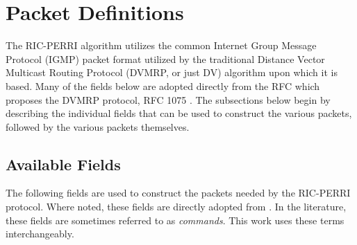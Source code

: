 \section{Packet Definitions}\label{sec:packetDefinitions}
The RIC-PERRI algorithm utilizes the common Internet Group Message Protocol (IGMP) packet format utilized by the traditional Distance Vector Multicast Routing Protocol (DVMRP, or just DV) algorithm upon which it is based. Many of the fields below are adopted directly from the RFC which proposes the DVMRP protocol, RFC 1075 \cite{waitzman_distance_1988}. The subsections below begin by describing the individual fields that can be used to construct the various packets, followed by the various packets themselves.
\subsection{Available Fields}\label{subsec:PDAvailableFields}
The following fields are used to construct the packets needed by the RIC-PERRI protocol. Where noted, these fields are directly adopted from \cite{waitzman_distance_1988}. In the literature, these fields are sometimes referred to as \emph{commands}. This work uses these terms interchangeably.

